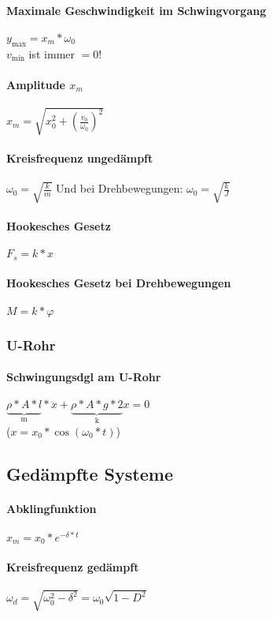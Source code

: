\documentclass[a4paper, 12pt]{scrreprt}
\begin{document}
\paragraph{Maximale Geschwindigkeit im Schwingvorgang} \dotfill \(y_{\max} = x_m * \omega _0\)\\
\myhspace \textcolor{myred}{\(v_{\min}\) ist immer \(= 0\)!}
\paragraph{Amplitude \(x_m\)} \dotfill \(x_m = \sqrt{x_0^2 + {\left( \frac{v_0}{\omega _0} \right)}^2}\)
\paragraph{Kreisfrequenz ungedämpft} \dotfill \(\omega_0=\sqrt{\frac{k}{m}}\) Und bei Drehbewegungen: \(\omega_0=\sqrt{\frac{k}{J}}\)
\paragraph{Hookesches Gesetz} \dotfill \(F_s=k*x\)
\paragraph{Hookesches Gesetz bei Drehbewegungen} \dotfill \(M = k * \varphi\)

\subsubsection{U-Rohr}
\paragraph{Schwingungsdgl am U-Rohr} \dotfill \(\underbrace{\rho*A*l}_\text{m}*\ddot x+\underbrace{\rho*A*g*2}_\text{k}x=0\)\\
(\(x=x_0*\cos(\omega_0*t)\))


\subsection{Gedämpfte Systeme}

\paragraph{Abklingfunktion} \dotfill \(x_m=x_0*e^{-\delta*t}\)
\paragraph{Kreisfrequenz gedämpft} \dotfill \(\omega_d=\sqrt{\omega_0^2-\delta^2}=\omega_0\sqrt{1-D^2}\)
\end{document}
